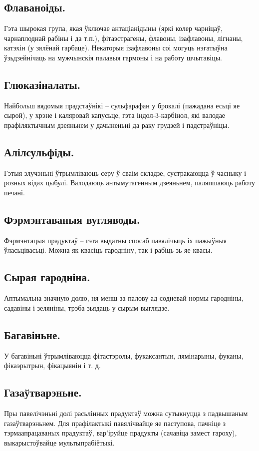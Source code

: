 \subsection{Флаваноіды.}
Гэта шырокая група, якая ўключае антаціанідыны (яркі колер чарніцаў, чарнаплоднай рабіны і да т.п.), фітаэстрагены, флавоны, ізафлавоны, лігнаны, катэхін (у зялёнай гарбаце). Некаторыя ізафлавоны соі могуць нэгатыўна ўзьдзейнічаць на мужчынскія палавыя гармоны і на работу шчытавіцы.

\subsection{Глюказіналаты.}
Найбольш вядомыя прадстаўнікі – сульфарафан у брокалі (пажадана есьці яе сырой), у хрэне і каляровай капусьце, гэта індол-3-карбінол, які валодае прафіляктычным дзеяньнем у дачыненьні да раку грудзей і падстраўніцы.

\subsection{Алілсульфіды.}
Гэтыя злучэньні ўтрымліваюць серу ў сваім складзе, сустракаюцца ў часныку і розных відах цыбулі. Валодаюць антымутагенным дзеяньнем, паляпшаюць работу печані.

\subsection{Фэрмэнтаваныя вугляводы.}
Фэрмэнтацыя прадуктаў – гэта выдатны спосаб павялічыць іх пажыўныя ўласьцівасьці. Можна як квасіць гародніну, так і рабіць зь яе квасы.

\subsection{Сырая гародніна.}
Аптымальна значную долю, ня менш за палову ад содневай нормы гародніны, садавіны і зеляніны, трэба зьядаць у сырым выглядзе.

\subsection{Багавіньне.}
У багавіньні ўтрымліваюцца фітастэролы, фукаксантын, лямінарыны, фуканы, фікаэрытрын, фікацыянін і т. д.

\subsection{Газаўтварэньне.}
Пры павелічэньні долі расьлінных прадуктаў можна сутыкнуцца з падвышаным газаўтварэньнем. Для прафілактыкі павялічвайце яе паступова, пачніце з тэрмаапрацаваных прадуктаў, вар'іруйце прадукты (сачавіца замест гароху), выкарыстоўвайце мультыпрабіётыкі.

